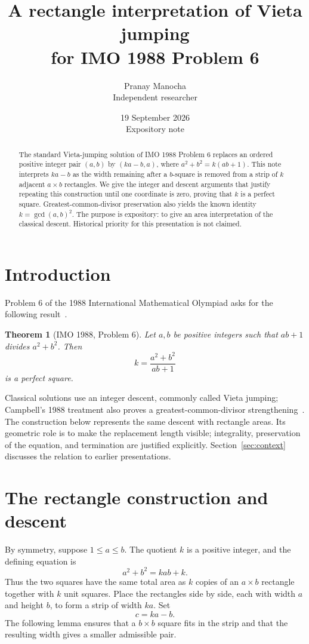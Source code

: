 \documentclass[11pt,a4paper]{article}
\title{A rectangle interpretation of Vieta jumping\\
  for IMO 1988 Problem 6}
\author{Pranay Manocha\\[3pt]\small Independent researcher}
\date{19 September 2026\\[3pt]\small Expository note}
\newtheorem{theorem}{Theorem}
\begin{document}
\maketitle

\begin{abstract}
The standard Vieta-jumping solution of IMO 1988 Problem 6 replaces an
ordered positive integer pair $(a,b)$ by $(ka-b,a)$, where
$a^2+b^2=k(ab+1)$. This note interprets $ka-b$ as the width remaining
after a $b$-square is removed from a strip of $k$ adjacent $a\times b$
rectangles. We give the integer and descent arguments that justify
repeating this construction until one coordinate is zero, proving that
$k$ is a perfect square. Greatest-common-divisor preservation also yields
the known identity $k=\gcd(a,b)^2$. The purpose is expository: to give an
area interpretation of the classical descent. Historical priority for
this presentation is not claimed.
\end{abstract}

\section{Introduction}
Problem 6 of the 1988 International Mathematical Olympiad asks for the
following result~\cite{imo}.

\begin{theorem}[IMO 1988, Problem 6]\label{thm:imo}
Let $a,b$ be positive integers such that $ab+1$ divides $a^2+b^2$.
Then
\[
 k=\frac{a^2+b^2}{ab+1}
\]
is a perfect square.
\end{theorem}

Classical solutions use an integer descent, commonly called Vieta jumping;
Campbell's 1988 treatment also proves a greatest-common-divisor
strengthening~\cite{campbell}. The construction below represents the same
descent with rectangle areas. Its geometric role is to make the replacement
length visible; integrality, preservation of the equation, and termination
are justified explicitly. Section~\ref{sec:context} discusses the relation
to earlier presentations.

\section{The rectangle construction and descent}
By symmetry, suppose $1\le a\le b$. The quotient $k$ is a positive integer,
and the defining equation is
\begin{equation}\label{eq:invariant}
 a^2+b^2=kab+k.
\end{equation}
Thus the two squares have the same total area as $k$ copies of an
$a\times b$ rectangle together with $k$ unit squares. Place the rectangles
side by side, each with width $a$ and height $b$, to form a strip of width
$ka$. Set
\begin{equation}\label{eq:jump}
 c=ka-b.
\end{equation}
The following lemma ensures that a $b\times b$ square fits in the strip
and that the resulting width gives a smaller admissible pair.
\end{document}
